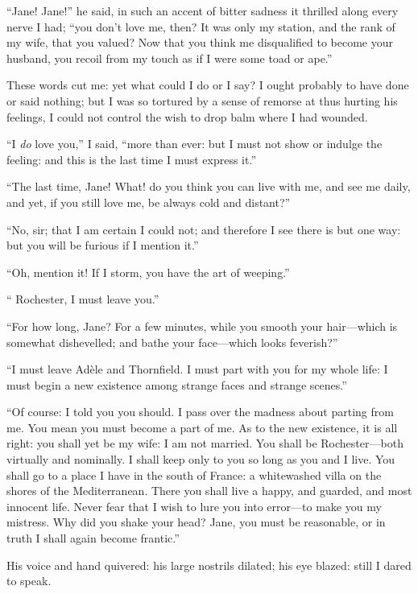 \enquote{Jane! Jane!} he said, in such an accent of bitter sadness it
thrilled along every nerve I had; \enquote{you don't love me, then? It
was only my station, and the rank of my wife, that you valued? Now that
you think me disqualified to become your husband, you recoil from my
touch as if I were some toad or ape.}

These words cut me: yet what could I do or I say? I ought probably to
have done or said nothing; but I was so tortured by a sense of remorse
at thus hurting his feelings, I could not control the wish to drop balm
where I had wounded.

\enquote{I \emph{do} love you,} I said, \enquote{more than ever: but I must
not show or indulge the feeling: and this is the last time I must
express it.}

\enquote{The last time, Jane! What! do you think you can live with me,
and see me daily, and yet, if you still love me, be always cold and
distant?}

\enquote{No, sir; that I am certain I could not; and therefore I see
there is but one way: but you will be furious if I mention it.}

\enquote{Oh, mention it! If I storm, you have the art of weeping.}

\enquote{\Mr{} Rochester, I must leave you.}

\enquote{For how long, Jane? For a few minutes, while you smooth your
hair---which is somewhat dishevelled; and bathe your face---which looks
feverish?}

\enquote{I must leave Adèle and Thornfield. I must part with you for my
whole life: I must begin a new existence among strange faces and strange
scenes.}

\enquote{Of course: I told you you should. I pass over the madness
about parting from me. You mean you must become a part of me. As to
the new existence, it is all right: you shall yet be my wife: I am not
married. You shall be \Mrs{} Rochester---both virtually and nominally. I
shall keep only to you so long as you and I live. You shall go to a
place I have in the south of France: a whitewashed villa on the shores
of the Mediterranean. There you shall live a happy, and guarded, and
most innocent life. Never fear that I wish to lure you into error---to
make you my mistress. Why did you shake your head? Jane, you must be
reasonable, or in truth I shall again become frantic.}

His voice and hand quivered: his large nostrils dilated; his eye blazed:
still I dared to speak.

